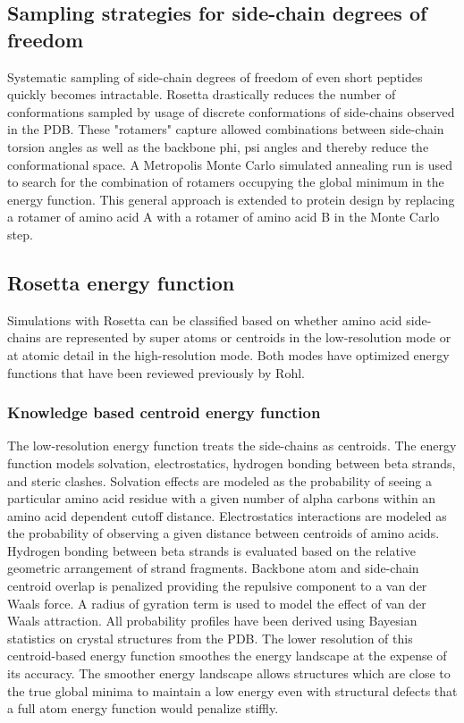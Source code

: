 \subsection{Sampling strategies for side-chain degrees of freedom}
Systematic sampling of side-chain degrees of freedom of even short peptides quickly becomes intractable\citep{Levinthal:1968vd}.
Rosetta drastically reduces the number of conformations sampled by usage of discrete conformations of side-chains observed in the PDB\citep{Kuhlman:2000tc,Dunbrack:1993jt}.
These "rotamers" capture allowed combinations between side-chain torsion angles as well as the backbone phi, psi angles and thereby reduce the conformational space\citep{Dunbrack:1993jt}.
A Metropolis Monte Carlo simulated annealing run is used to search for the combination of rotamers occupying the global minimum in the energy function\citep{Kuhlman:2000tc,LeaverFay:2005vc}.
This general approach is extended to protein design by replacing a rotamer of amino acid A with a rotamer of amino acid B in the Monte Carlo step.

\subsection{Rosetta energy function}
Simulations with Rosetta can be classified based on whether amino acid side-chains are represented by super atoms or centroids in the low-resolution mode or at atomic detail in the high-resolution mode.
Both modes have optimized energy functions that have been reviewed previously by Rohl\citep{Rohl:2004dh}.

\subsubsection{Knowledge based centroid energy function}
The low-resolution energy function treats the side-chains as centroids\citep{Simons:1997do,Simons:1999wp}.
The energy function models solvation, electrostatics, hydrogen bonding between beta strands, and steric clashes.
Solvation effects are modeled as the probability of seeing a particular amino acid residue with a given number of alpha carbons within an amino acid dependent cutoff distance.
Electrostatics interactions are modeled as the probability of observing a given distance between centroids of amino acids.
Hydrogen bonding between beta strands is evaluated based on the relative geometric arrangement of strand fragments.
Backbone atom and side-chain centroid overlap is penalized providing the repulsive component to a van der Waals force.
A radius of gyration term is used to model the effect of van der Waals attraction.
All probability profiles have been derived using Bayesian statistics on crystal structures from the PDB.
The lower resolution of this centroid-based energy function smoothes the energy landscape at the expense of its accuracy.
The smoother energy landscape allows structures which are close to the true global minima to maintain a low energy even with structural defects that a full atom energy function would penalize stiffly.

